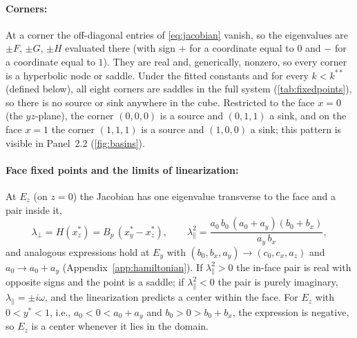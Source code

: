 \documentclass[10pt]{article}
\begin{document}
\paragraph{Corners:} At a corner the off-diagonal entries of \cref{eq:jacobian} vanish, so the eigenvalues are $\pm F$, $\pm G$, $\pm H$ evaluated there (with sign $+$ for a coordinate equal to $0$ and $-$ for a coordinate equal to $1$). They are real and, generically, nonzero, so every corner is a hyperbolic node or saddle. Under the fitted constants and for every $k<k^{**}$ (defined below), all eight corners are saddles in the full system (\cref{tab:fixedpoints}), so there is no source or sink anywhere in the cube. Restricted to the face $x=0$ (the $yz$-plane), the corner $(0,0,0)$ is a source and $(0,1,1)$ a sink, and on the face $x=1$ the corner $(1,1,1)$ is a source and $(1,0,0)$ a sink; this pattern is visible in Panel~2.2 (\cref{fig:basins}).

\paragraph{Face fixed points and the limits of linearization:} At $E_z$ (on $z=0$) the Jacobian has one eigenvalue transverse to the face and a pair inside it,
\begin{equation}
\lambda_\perp = H(x_z^*) = B_p\,(x_y^*-x_z^*),\qquad
\lambda_\parallel^2 = \frac{a_0\,b_0\,(a_0+a_y)(b_0+b_x)}{a_y\,b_x},
\label{eq:eigEz}
\end{equation}
and analogous expressions hold at $E_y$ with $(b_0,b_x,a_y)\to(c_0,c_x,a_z)$ and $a_0\to a_0+a_y$ (Appendix~\ref{app:hamiltonian}). If $\lambda_\parallel^2>0$ the in-face pair is real with opposite signs and the point is a saddle; if $\lambda_\parallel^2<0$ the pair is purely imaginary, $\lambda_\parallel=\pm i\omega$, and the linearization predicts a center within the face. For $E_z$ with $0<y^*<1$, i.e., $a_0<0<a_0+a_y$ and $b_0>0>b_0+b_x$, the expression is negative, so $E_z$ is a center whenever it lies in the domain. 
\end{document}
